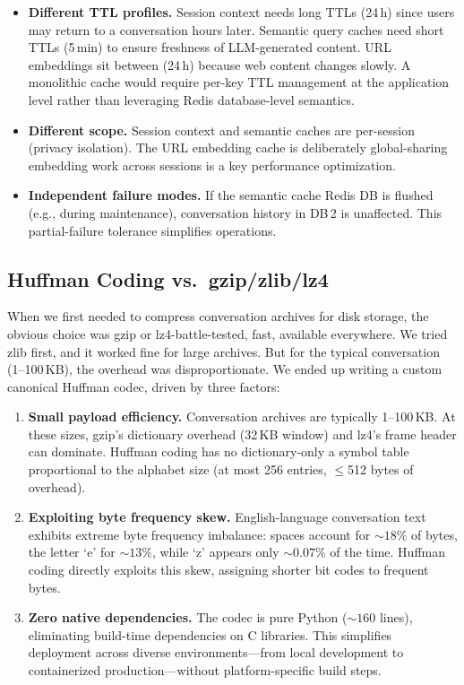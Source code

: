 \documentclass[conference]{IEEEtran}
\begin{document}
\begin{itemize}
\item \textbf{Different TTL profiles.} Session context needs long TTLs (24\,h) since users may return to a conversation hours later. Semantic query caches need short TTLs (5\,min) to ensure freshness of LLM-generated content. URL embeddings sit between (24\,h) because web content changes slowly. A monolithic cache would require per-key TTL management at the application level rather than leveraging Redis database-level semantics.

\item \textbf{Different scope.} Session context and semantic caches are per-session (privacy isolation). The URL embedding cache is deliberately global-sharing embedding work across sessions is a key performance optimization.

\item \textbf{Independent failure modes.} If the semantic cache Redis DB is flushed (e.g., during maintenance), conversation history in DB\,2 is unaffected. This partial-failure tolerance simplifies operations.
\end{itemize}

\subsection{Huffman Coding vs.\ gzip/zlib/lz4}

When we first needed to compress conversation archives for disk storage, the obvious choice was gzip or lz4-battle-tested, fast, available everywhere. We tried zlib first, and it worked fine for large archives. But for the typical conversation (1--100\,KB), the overhead was disproportionate. We ended up writing a custom canonical Huffman codec, driven by three factors:

\begin{enumerate}
\item \textbf{Small payload efficiency.} Conversation archives are typically 1--100\,KB. At these sizes, gzip's dictionary overhead (32\,KB window) and lz4's frame header can dominate. Huffman coding has no dictionary-only a symbol table proportional to the alphabet size (at most 256 entries, $\leq$512 bytes of overhead).

\item \textbf{Exploiting byte frequency skew.} English-language conversation text exhibits extreme byte frequency imbalance: spaces account for ${\sim}18\%$ of bytes, the letter `e' for ${\sim}13\%$, while `z' appears only ${\sim}0.07\%$ of the time. Huffman coding directly exploits this skew, assigning shorter bit codes to frequent bytes.

\item \textbf{Zero native dependencies.} The codec is pure Python (${\sim}160$ lines), eliminating build-time dependencies on C libraries. This simplifies deployment across diverse environments---from local development to containerized production---without platform-specific build steps.
\end{enumerate}
\end{document}
